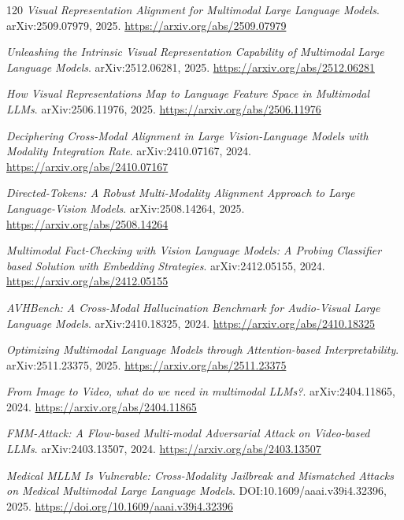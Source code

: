 \documentclass[11pt,a4paper]{article}
\begin{document}
\begin{thebibliography}{120}
\newblock \emph{Visual Representation Alignment for Multimodal Large Language Models}.
\newblock arXiv:2509.07979, 2025.
\newblock \url{https://arxiv.org/abs/2509.07979}

\newblock \emph{Unleashing the Intrinsic Visual Representation Capability of Multimodal Large Language Models}.
\newblock arXiv:2512.06281, 2025.
\newblock \url{https://arxiv.org/abs/2512.06281}

\newblock \emph{How Visual Representations Map to Language Feature Space in Multimodal LLMs}.
\newblock arXiv:2506.11976, 2025.
\newblock \url{https://arxiv.org/abs/2506.11976}

\newblock \emph{Deciphering Cross-Modal Alignment in Large Vision-Language Models with Modality Integration Rate}.
\newblock arXiv:2410.07167, 2024.
\newblock \url{https://arxiv.org/abs/2410.07167}

\newblock \emph{Directed-Tokens: A Robust Multi-Modality Alignment Approach to Large Language-Vision Models}.
\newblock arXiv:2508.14264, 2025.
\newblock \url{https://arxiv.org/abs/2508.14264}

\newblock \emph{Multimodal Fact-Checking with Vision Language Models: A Probing Classifier based Solution with Embedding Strategies}.
\newblock arXiv:2412.05155, 2024.
\newblock \url{https://arxiv.org/abs/2412.05155}

\newblock \emph{AVHBench: A Cross-Modal Hallucination Benchmark for Audio-Visual Large Language Models}.
\newblock arXiv:2410.18325, 2024.
\newblock \url{https://arxiv.org/abs/2410.18325}

\newblock \emph{Optimizing Multimodal Language Models through Attention-based Interpretability}.
\newblock arXiv:2511.23375, 2025.
\newblock \url{https://arxiv.org/abs/2511.23375}

\newblock \emph{From Image to Video, what do we need in multimodal LLMs?}.
\newblock arXiv:2404.11865, 2024.
\newblock \url{https://arxiv.org/abs/2404.11865}

\newblock \emph{FMM-Attack: A Flow-based Multi-modal Adversarial Attack on Video-based LLMs}.
\newblock arXiv:2403.13507, 2024.
\newblock \url{https://arxiv.org/abs/2403.13507}

\newblock \emph{Medical MLLM Is Vulnerable: Cross-Modality Jailbreak and Mismatched Attacks on Medical Multimodal Large Language Models}.
\newblock DOI:10.1609/aaai.v39i4.32396, 2025.
\newblock \url{https://doi.org/10.1609/aaai.v39i4.32396}


\end{thebibliography}
\end{document}
